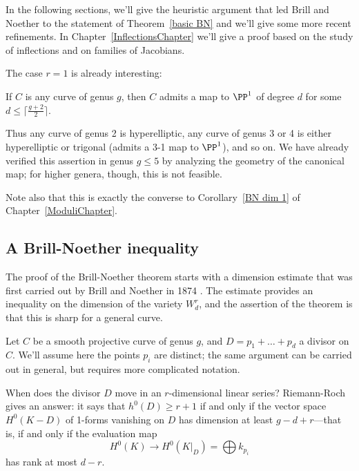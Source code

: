 In the following sections, we'll give the heuristic argument that led Brill and Noether to the statement of Theorem~\ref{basic BN} and we'll give some more recent refinements.   In Chapter~\ref{InflectionsChapter} we'll give a proof based on the study
of inflections and on families of Jacobians.%

The case $r=1$ is already interesting:

\begin{corollary}
If $C$ is any curve of genus $g$, then $C$ admits a map  to $\PP^1$ of degree $d$ for some $d \leq \lceil \frac{g+2}{2}\rceil$.
\end{corollary}

Thus any curve of genus 2 is hyperelliptic, any curve of genus 3 or 4 is either hyperelliptic or trigonal  (admits a 3-1 map to $\PP^1$), and so on. We have already verified this assertion in genus $g \leq 5$ by analyzing the geometry of the canonical map; for higher genera, though, this is not feasible.

Note also that this is exactly the converse to Corollary~\ref{BN dim 1} of Chapter~\ref{ModuliChapter}.


\subsection{A Brill-Noether inequality}

The proof of the Brill-Noether theorem starts with a dimension estimate that was first carried out by Brill and Noether in 1874 \cite{Brill-NoetherOriginal}. The estimate provides an inequality on the dimension
of the variety $W^r_d$, and the assertion of the theorem is that this is sharp for a general curve.


Let $C$ be a smooth projective curve of genus $g$, and $D = p_1 + \dots + p_d$ a divisor on $C$. We'll assume here the points $p_i$ are distinct; the same argument  can be carried out in general, but requires more complicated notation.

When does the divisor $D$ move in an $r$-dimensional linear series? Riemann-Roch gives an answer: it says that $h^0(D) \geq r+1$ if and only if the vector space $H^0(K-D)$ of 1-forms vanishing on $D$ has dimension at least $g-d+r$---that is, if and only if the  evaluation map
$$
H^0(K) \to H^0(K|_D) = \bigoplus k_{p_i}
$$
has rank at most $d-r$. 

